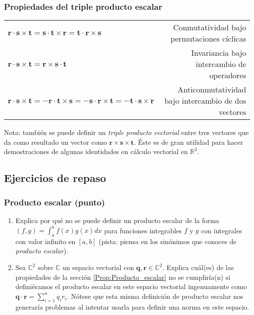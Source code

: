 \documentclass[12pt]{article}
\begin{document}
\subsubsection{Propiedades del triple producto escalar} \label{Prop:Triple_producto_escalar}

\begin{center}
\begin{tabular}{lr}
    $\mathbf{r}\cdot\mathbf{s}\times\mathbf{t} = \mathbf{s}\cdot\mathbf{t}\times\mathbf{r} = \mathbf{t}\cdot\mathbf{r}\times\mathbf{s}$ & Conmutatividad bajo permutaciones cíclicas \\
    $\mathbf{r}\cdot\mathbf{s}\times\mathbf{t} = \mathbf{r}\times\mathbf{s}\cdot\mathbf{t}$ & Invariancia bajo intercambio de operadores \\
    $\mathbf{r}\cdot\mathbf{s}\times\mathbf{t} = -\mathbf{r}\cdot\mathbf{t}\times\mathbf{s} = -\mathbf{s}\cdot\mathbf{r}\times\mathbf{t} = -\mathbf{t}\cdot\mathbf{s}\times\mathbf{r}$ & Anticonmutatividad bajo intercambio de dos vectores \\
\end{tabular}
\end{center}

Nota: también se puede definir un \emph{triple producto vectorial} entre tres vectores que da como resultado un vector como $\mathbf{r}\times\mathbf{s}\times\mathbf{t}$. Éste es de gran utilidad para hacer demostraciones de algunas identidades en cálculo vectorial en $\mathbb{R}^3$.

\newpage
\subsection{Ejercicios de repaso}

\subsubsection{Producto escalar (punto)}

\begin{enumerate}
    \item Explica por qué no se puede definir un producto escalar de la forma $(f,g)=\int_a^b f(x)g(x)dx$ para funciones integrables $f$ y $g$ con integrales con valor infinito en $[a,b]$ (pista: piensa en los sinónimos que conoces de \emph{producto escalar}).
    \item Sea $\mathbb{C}^2$ sobre $\mathbb{C}$ un espacio vectorial con $\mathbf{q},\mathbf{r}\in\mathbb{C}^2$. Explica cuál(es) de las propiedades de la sección \ref{Prop:Producto_escalar} no se cumpliría(n) si definiéramos el producto escalar en este espacio vectorial ingenuamente como $\mathbf{q}\cdot\mathbf{r}=\sum_{i=1}^n q_ir_i$. Nótese que esta misma definición de producto escalar nos generaría problemas al intentar usarla para definir una norma en este espacio.
\end{enumerate}
\end{document}
